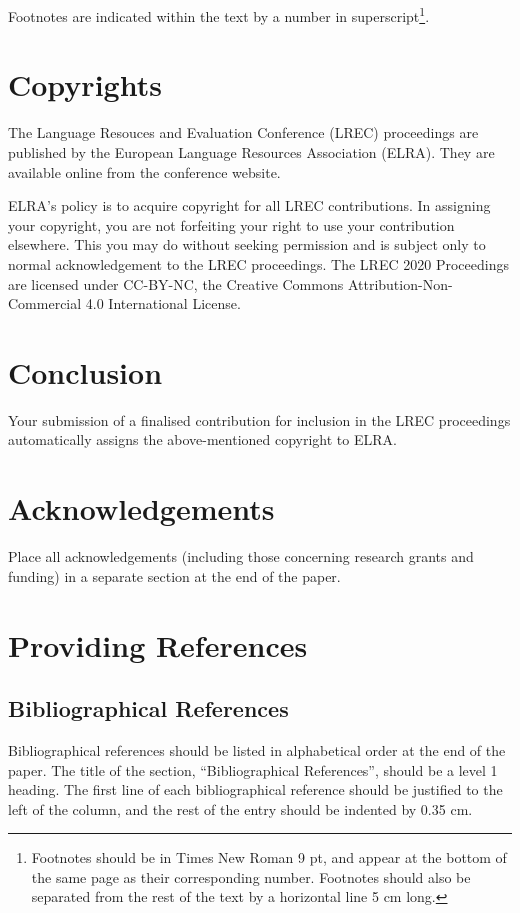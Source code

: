 \documentclass[10pt, a4paper]{article}
\begin{document}
Footnotes are indicated within the text by a number in
superscript\footnote{Footnotes should be in Times New Roman 9 pt, and appear at
the bottom of the same page as their corresponding number. Footnotes should also
be separated from the rest of the text by a horizontal line 5 cm long.}.

\section{Copyrights}

The Language Resouces and Evaluation Conference (LREC)
proceedings are published by the European Language Resources Association (ELRA).
They are available online from the conference website.


ELRA's policy is to acquire copyright for all LREC contributions. In assigning
your copyright, you are not forfeiting your right to use your contribution
elsewhere. This you may do without seeking permission and is subject only to
normal acknowledgement to the LREC proceedings. The LREC 2020 Proceedings are
licensed under CC-BY-NC, the Creative Commons Attribution-Non-Commercial 4.0
International License.

\section{Conclusion}

Your submission of a finalised contribution for inclusion in the LREC
proceedings automatically assigns the above-mentioned copyright to ELRA.

\section{Acknowledgements}

Place all acknowledgements (including those concerning research grants and
funding) in a separate section at the end of the paper.

\section{Providing References}

\subsection{Bibliographical References} 
Bibliographical references should be listed in alphabetical order at the
end of the paper. The title of the section, ``Bibliographical References'',
should be a level 1 heading. The first line of each bibliographical reference
should be justified to the left of the column, and the rest of the entry should
be indented by 0.35 cm.
\end{document}
